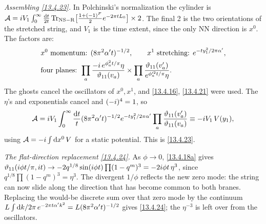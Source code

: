 \begin{tcolorbox}[breakable]
\begin{remark}
		\textit{Assembling \eqref{13.4.23}.} In Polchinski's normalization the cylinder is $\mathcal A=i V_1\int_0^\infty\frac{\mathrm{d} t}{2t}\operatorname{Tr}_{\rm NS-R}\bigl[\frac{1+(-1)^F}{2}e^{-2\pi tL_0}\bigr]\times2$. The final 2 is the two orientations of the stretched string, and $V_1$ is the time extent, since the only NN direction is $x^0$. The factors are:
		\begin{align*}
			&x^0\text{ momentum: }(8\pi^2\alpha't)^{-1/2},\qquad x^1\text{ stretching: }e^{-ty_1^2/2\pi\alpha'},\\
			&\text{four planes: }\prod_a\frac{-i\,e^{\phi_a^2t/\pi}\eta}{\vartheta_{11}(v_a)}\times\prod_a\frac{\vartheta_{11}(v'_a)}{e^{\phi'^2_at/\pi}\eta} .
		\end{align*}
		The ghosts cancel the oscillators of $x^0,x^1$, and \eqref{13.4.16}, \eqref{13.4.21} were used. The $\eta$'s and exponentials cancel and $(-i)^4=1$, so
		\begin{equation*}
			\mathcal A = i V_1\int_0^\infty\frac{\mathrm{d} t}{t}(8\pi^2\alpha't)^{-1/2}e^{-ty_1^2/2\pi\alpha'}\prod_a\frac{\vartheta_{11}(v'_a)}{\vartheta_{11}(v_a)} \equiv -i V_1\,V(y_1),
		\end{equation*}
		using $\mathcal A=-i\int\mathrm{d} x^0\,V$ for a static potential. This is \eqref{13.4.23}.

		\textit{The flat-direction replacement \eqref{13.4.24}.} As $\phi\to0$, \eqref{13.4.18a} gives $\vartheta_{11}(i\phi t/\pi,i t)\to-2q^{1/8}\sin(i\phi t)\prod(1-q^m)^3=-2i\phi t\,\eta^3$, since $q^{1/8}\prod(1-q^m)^3=\eta^3$. The divergent $1/\phi$ reflects the new zero mode: the string can now slide along the direction that has become common to both branes. Replacing the would-be discrete sum over that zero mode by the continuum $L\int\mathrm{d} k/2\pi\,e^{-2\pi t\alpha'k^2}=L(8\pi^2\alpha't)^{-1/2}$ gives \eqref{13.4.24}; the $\eta^{-3}$ is left over from the oscillators.
	\end{remark}
\end{tcolorbox}

